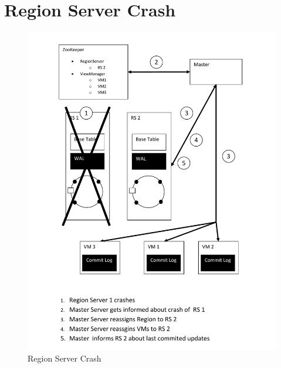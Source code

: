 \section{Region Server Crash}
\begin{figure}[h!]
  \centering
    \includegraphics[scale=0.8]{figures/SO_RegionServerCrash}
     \caption{Region Server Crash}
    \label{fig:regionservercrash}
\end{figure}
\newpage

